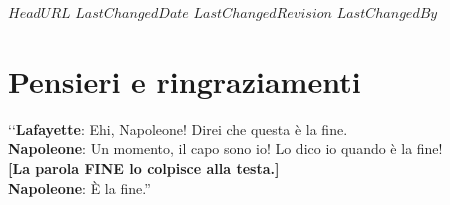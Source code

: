 \svnidlong
{$HeadURL$}
{$LastChangedDate$}
{$LastChangedRevision$}
{$LastChangedBy$}

\chapter{Pensieri e ringraziamenti}

\begin{introduction}
‘‘\textbf{Lafayette}: Ehi, Napoleone! Direi che questa è la fine.\\
\textbf{Napoleone}: Un momento, il capo sono io! Lo dico io quando è la fine!\\
\textbf{[La parola \textsf{FINE} lo colpisce alla testa.]}\\
\textbf{Napoleone}: È la fine.''
\begin{flushright}
\end{flushright}
\end{introduction}

